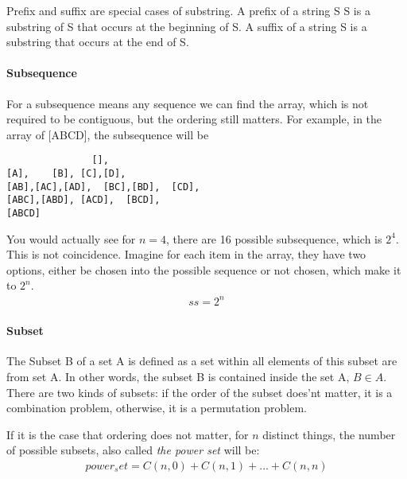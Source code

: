 \documentclass[../main.tex]{subfiles}
\begin{document}
Prefix and suffix are special cases of substring. A prefix of a string S S is a substring of S that occurs at the beginning of  S. A suffix of a string S is a substring that occurs at the end of S. 
\paragraph{Subsequence} For a subsequence means any sequence we can find the array, which is not required to be contiguous, but the ordering still matters. For example, in the array of [ABCD], the subsequence will be
\begin{lstlisting}
               [],
[A],    [B], [C],[D],
[AB],[AC],[AD],  [BC],[BD],  [CD],
[ABC],[ABD], [ACD],  [BCD],
[ABCD]
\end{lstlisting}
You would actually see for $n=4$, there are 16 possible subsequence, which is $2^4$. This is not coincidence. Imagine for each item in the array, they have two options, either be chosen into the possible sequence or not chosen, which make it to $2^n$. 
\begin{align}
    ss=2^n
\end{align}
\paragraph{Subset} The Subset B of a set A is defined as a set within all elements of this subset are from set A. In other words, the subset B is contained inside the set A, $B \in A$. There are two kinds of subsets: if the order of the subset does'nt matter, it is a combination problem, otherwise, it is a permutation problem. 

If it is the case that ordering does not matter, for $n$ distinct things, the number of possible subsets, also called \textit{the power set} will be:
\begin{align}
    power_set = C(n,0)+C(n,1)+...+C(n,n)
\end{align}
\end{document}
